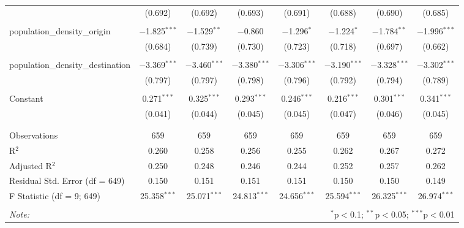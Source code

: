 \begin{table}[!htbp]
\begin{tabular}{@{\extracolsep{5pt}}lccccccc}
  & (0.692) & (0.692) & (0.693) & (0.691) & (0.688) & (0.690) & (0.685) \\ 
  & & & & & & & \\ 
 population\_density\_origin & $-$1.825$^{***}$ & $-$1.529$^{**}$ & $-$0.860 & $-$1.296$^{*}$ & $-$1.224$^{*}$ & $-$1.784$^{**}$ & $-$1.996$^{***}$ \\ 
  & (0.684) & (0.739) & (0.730) & (0.723) & (0.718) & (0.697) & (0.662) \\ 
  & & & & & & & \\ 
 population\_density\_destination & $-$3.369$^{***}$ & $-$3.460$^{***}$ & $-$3.380$^{***}$ & $-$3.306$^{***}$ & $-$3.190$^{***}$ & $-$3.328$^{***}$ & $-$3.302$^{***}$ \\ 
  & (0.797) & (0.797) & (0.798) & (0.796) & (0.792) & (0.794) & (0.789) \\ 
  & & & & & & & \\ 
 Constant & 0.271$^{***}$ & 0.325$^{***}$ & 0.293$^{***}$ & 0.246$^{***}$ & 0.216$^{***}$ & 0.301$^{***}$ & 0.341$^{***}$ \\ 
  & (0.041) & (0.044) & (0.045) & (0.045) & (0.047) & (0.046) & (0.045) \\ 
  & & & & & & & \\ 
\hline \\[-1.8ex] 
Observations & 659 & 659 & 659 & 659 & 659 & 659 & 659 \\ 
R$^{2}$ & 0.260 & 0.258 & 0.256 & 0.255 & 0.262 & 0.267 & 0.272 \\ 
Adjusted R$^{2}$ & 0.250 & 0.248 & 0.246 & 0.244 & 0.252 & 0.257 & 0.262 \\ 
Residual Std. Error (df = 649) & 0.150 & 0.151 & 0.151 & 0.151 & 0.150 & 0.150 & 0.149 \\ 
F Statistic (df = 9; 649) & 25.358$^{***}$ & 25.071$^{***}$ & 24.813$^{***}$ & 24.656$^{***}$ & 25.594$^{***}$ & 26.325$^{***}$ & 26.974$^{***}$ \\ 
\hline 
\hline \\[-1.8ex] 
\textit{Note:}  & \multicolumn{7}{r}{$^{*}$p$<$0.1; $^{**}$p$<$0.05; $^{***}$p$<$0.01} \\ 
\end{tabular} 
\end{table} 
